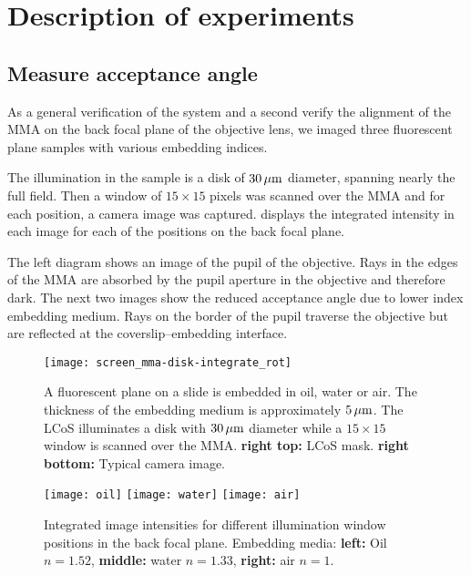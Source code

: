 \chapter{Description of experiments}

\section{Measure acceptance angle}
As a general verification of the system and a second verify the
alignment of the MMA on the back focal plane of the objective lens, we
imaged three fluorescent plane samples with various embedding indices.

The illumination in the sample is a disk of $\unit[30]{\mu m}$
diameter, spanning nearly the full field. Then a window of
$15\times15$ pixels was scanned over the MMA and for each position, a
camera image was captured.  displays
the integrated intensity in each image for each of the positions on
the back focal plane.

The left diagram shows an image of the pupil of the objective. Rays in
the edges of the MMA are absorbed by the pupil aperture in the
objective and therefore dark. The next two images show the reduced
acceptance angle due to lower index embedding medium. Rays on the
border of the pupil traverse the objective but are reflected at the
coverslip--embedding interface.

\begin{figure}[!hbt]
  \centering
   
  \texttt{[image: screen\_mma-disk-integrate\_rot]}
  \caption{A fluorescent plane on a slide is embedded in oil, water or
    air. The thickness of the embedding medium is approximately
    $\unit[5]{\mu m}$. The LCoS illuminates a disk with $\unit[30]{\mu
      m}$ diameter while a $15\times 15$ window is scanned over the
    MMA. {\bf right top:} LCoS mask. {\bf right bottom:} Typical
    camera image.}
  \label{fig:tirf-exp}
\end{figure}


\begin{figure}[!hbt]
  \centering
  \texttt{[image: oil]}
  \texttt{[image: water]}
  \texttt{[image: air]}
  \caption{Integrated image intensities for different illumination
    window positions in the back focal plane. Embedding media: {\bf
      left:} Oil $n=1.52$, {\bf middle:} water $n=1.33$, {\bf right:}
    air $n=1$.  }
  \label{fig:immersion-bfp-scan}
\end{figure}

